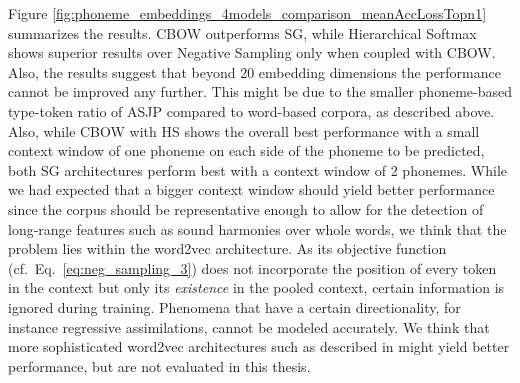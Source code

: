 \documentclass[6pt]{article}
\begin{document}
Figure \ref{fig:phoneme_embeddings_4models_comparison_meanAccLossTopn1} summarizes the results.  CBOW outperforms SG, while Hierarchical Softmax shows superior results over Negative Sampling only when coupled with CBOW. Also, the results suggest  that beyond 20 embedding dimensions the performance cannot be improved any further. This might be due to the smaller phoneme-based type-token ratio of ASJP compared to word-based corpora, as described above.  Also, while CBOW with HS shows the overall best performance with a small context window of one phoneme on each side of the phoneme to be predicted, both SG architectures perform best with a context window of 2 phonemes. While we had expected that a bigger context window should yield better performance since the corpus should be representative enough to allow for the detection of long-range features such as sound harmonies over whole words, we think that the problem lies within  the word2vec architecture. As its objective function (cf.\ Eq.\ \ref{eq:neg_sampling_3}) does not incorporate the position of every token in the context but only its \textit{existence} in the pooled context, certain information is ignored during training. Phenomena that have a certain directionality, for instance regressive  assimilations, cannot be modeled accurately. We think that more sophisticated word2vec architectures such as described in \cite{ling2015two} might yield better performance, but are not evaluated in this thesis.
\end{document}
